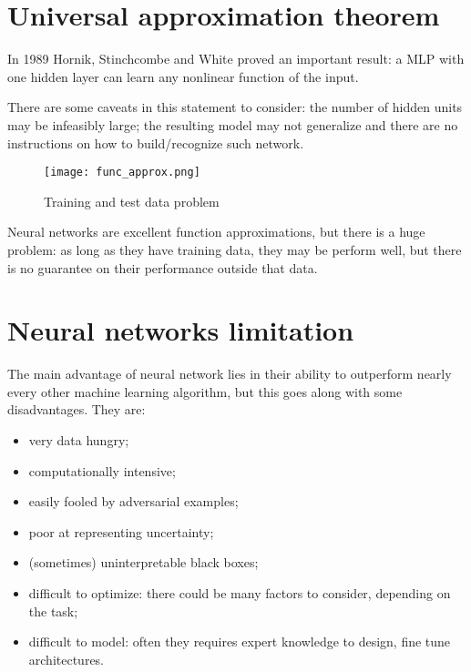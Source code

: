 \section{Universal approximation theorem}

In 1989 Hornik, Stinchcombe and White proved an important result: a MLP with one hidden layer can learn any nonlinear function of the input.

There are some caveats in this statement to consider: the number of hidden units may be infeasibly large; the resulting model may not generalize and there are no instructions on how to build/recognize such network.

\begin{figure}[H]
  \centering
  \texttt{[image: func\_approx.png]}
  \caption{Training and test data problem}
\end{figure}

Neural networks are excellent function approximations, but there is a huge
problem: as long as they have training data, they may be perform well, but
there is no guarantee on their performance outside that data.

\section{Neural networks limitation}

The main advantage of neural network lies in their ability to outperform nearly every other machine learning algorithm, but this goes along with some disadvantages. They are:

\begin{itemize}
 \item very data hungry;
 \item computationally intensive;
 \item easily fooled by adversarial examples;
 \item poor at representing uncertainty;
 \item (sometimes) uninterpretable black boxes;
 \item difficult to optimize: there could be many factors to consider, depending on the task;
 \item difficult to model: often they requires expert knowledge to design, fine tune architectures.
\end{itemize}
